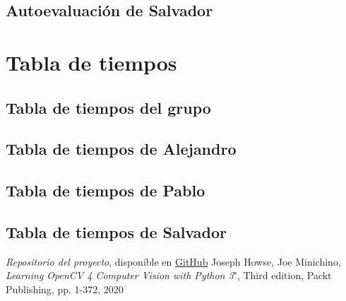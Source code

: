 \documentclass[a4paper]{article}
\begin{document}
\subsection{Autoevaluación de Salvador}

\section{Tabla de tiempos}

\subsection{Tabla de tiempos del grupo}

\subsection{Tabla de tiempos de Alejandro}

\subsection{Tabla de tiempos de Pablo}

\subsection{Tabla de tiempos de Salvador}

\begin{thebibliography}{99}
 \textit{Repositorio del proyecto}, disponible en \href{https://github.com/PacktPublishing/Learning-OpenCV-4-Computer-Vision-with-Python-Third-Edition}{GitHub}
 Joseph Howse, Joe Minichino, \textit{Learning OpenCV 4 Computer Vision with Python 3}", Third edition, Packt Publishing, pp. 1-372, 2020
\end{thebibliography}
\end{document}
